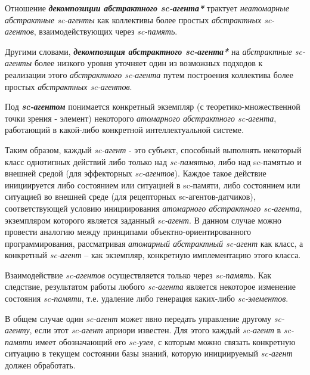 \begin{SCn}
\end{SCn}

Отношение \textbf{\textit{декомпозиции абстрактного sc-агента*}} трактует \textit{неатомарные абстрактные sc-агенты} как коллективы более простых \textit{абстрактных sc-агентов}, взаимодействующих через \textit{sc-память}.
	
Другими словами, \textbf{\textit{декомпозиция абстрактного sc-агента*}} на \textit{абстрактные sc-агенты} более низкого уровня уточняет один из возможных подходов к реализации этого \textit{абстрактного sc-агента} путем построения коллектива более простых \textit{абстрактных sc-агентов}.

\begin{SCn}
\end{SCn}

Под \textbf{\textit{sc-агентом}} понимается конкретный экземпляр (с теоретико-множественной точки зрения - элемент) некоторого \textit{атомарного абстрактного sc-агента}, работающий в какой-либо конкретной интеллектуальной системе.
	
Таким образом, каждый \textit{sc-агент} - это субъект, способный выполнять некоторый класс однотипных действий либо только над \textit{sc-памятью}, либо над sc-памятью и внешней средой (для эффекторных \textit{sc-агентов}). Каждое такое действие инициируется либо состоянием или ситуацией в sc-памяти, либо состоянием или ситуацией во внешней среде (для рецепторных sc-агентов-датчиков),  соответствующей условию инициирования \textit{атомарного абстрактного sc-агента}, экземпляром которого является заданный \textit{sc-агент}. В данном случае можно провести аналогию между принципами объектно-ориентированного программирования, рассматривая \textit{атомарный абстрактный sc-агент} как класс, а конкретный \textit{sc-агент} – как экземпляр, конкретную имплементацию этого класса.
	
Взаимодействие \textit{sc-агентов} осуществляется только через \textit{sc-память}. Как следствие, результатом работы любого \textit{sc-агента} является некоторое изменение состояния \textit{sc-памяти}, т.е. удаление либо генерация каких-либо \textit{sc-элементов}.
	
В общем случае один \textit{sc-агент} может явно передать управление другому \textit{sc-агенту}, если этот \textit{sc-агент} априори известен. Для этого каждый \textit{sc-агент} в \textit{sc-памяти} имеет обозначающий его \textit{sc-узел}, с которым можно связать конкретную ситуацию в текущем состоянии базы знаний, которую инициируемый \textit{sc-агент} должен обработать.
	
